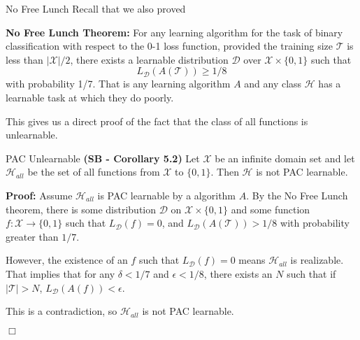 \documentclass[10pt, table, dvipsnames, handout]{beamer}
\newcommand{\cT}{\ensuremath{\mathcal{T}}}
\newcommand{\cD}{\ensuremath{\mathcal{D}}}
\newcommand{\cX}{\ensuremath{\mathcal{X}}}
\newcommand{\cH}{\ensuremath{\mathcal{H}}}
\begin{document}
\begin{frame}[fragile]{No Free Lunch}
Recall that we also proved

\textbf{No Free Lunch Theorem:} For any learning algorithm for the task of binary classification with respect to the 0-1 loss function, provided the training size $\cT$ is less than $|\cX|/2$, there exists a learnable distribution $\cD$ over $\cX\times \{0,1\}$ such that 
$$
L_\cD(A(\cT)) \geq 1/8
$$
with probability 1/7. \pause That is any learning algorithm $A$ and any class $\cH$ has a learnable task at which they do poorly. \pause 

This gives us a direct proof of the fact that the class of all functions is unlearnable.
\end{frame}





\begin{frame}[fragile]{PAC Unlearnable}
\textbf{(SB - Corollary 5.2)} Let $\cX$ be an infinite domain set and let $\cH_{all}$ be the set of all functions from $\cX$ to $\{0,1\}$. Then $\cH$ is not PAC learnable.\pause\newline

\textbf{Proof:} Assume $\cH_{all}$ is PAC learnable by a algorithm $A$. \pause By the No Free Lunch theorem, there is some distribution $\cD$ on $\cX\times\{0,1\}$ and some function $f:\cX\to \{0,1\}$ such that $L_\cD(f) = 0$, and $L_\cD(A(\cT))>1/8$ with probability greater than $1/7$. \pause

However, the existence of an $f$ such that $L_\cD(f) = 0$ means $\cH_{all}$ is realizable. \pause That implies that for any $ \delta<1/7$ and $\epsilon<1/8$, there exists an $N$ such that if $|\cT|>N$, $L_\cD(A(f))<\epsilon.$ \pause 

This is a contradiction, so $\cH_{all}$ is not PAC learnable. 

\hspace*{\fill} $\Box$
\end{frame}
\end{document}
